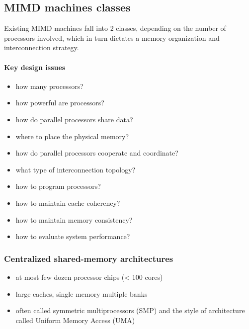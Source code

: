 \subsection{MIMD machines classes}\label{subsec:mimd-machines}
Existing MIMD machines fall into 2 classes, depending on the number
of processors involved, which in turn dictates a memory organization
and interconnection strategy.

\paragraph{Key design issues}
\begin{itemize}
    \item how many processors?
    \item how powerful are processors?
    \item how do parallel processors share data?
    \item where to place the physical memory?
    \item how do parallel processors cooperate and coordinate?
    \item what type of interconnection topology?
    \item how to program processors?
    \item how to maintain cache coherency?
    \item how to maintain memory consistency?
    \item how to evaluate system performance?
\end{itemize}

\subsubsection{Centralized shared-memory architectures}\label{subsubsec:centralized-shared-memory-architectures}
\begin{itemize}
    \item at most few dozen processor chips (< 100 cores)
    \item large caches, single memory multiple banks
    \item often called symmetric multiprocessors (SMP) and the
    style of architecture called Uniform Memory Access (UMA)
\end{itemize}


